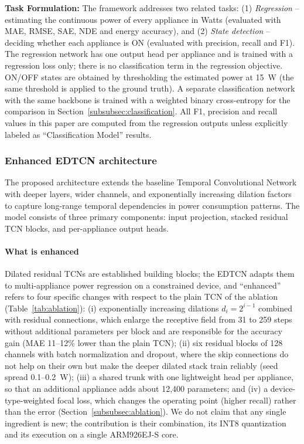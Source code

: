 \documentclass[fleqn,10pt]{wlscirep}
\begin{document}
\textbf{Task Formulation:} The framework addresses two related tasks: (1) \textit{Regression} -- estimating the continuous power of every appliance in Watts (evaluated with MAE, RMSE, SAE, NDE and energy accuracy), and (2) \textit{State detection} -- deciding whether each appliance is ON (evaluated with precision, recall and F1). The regression network has one output head per appliance and is trained with a regression loss only; there is no classification term in the regression objective. ON/OFF states are obtained by thresholding the estimated power at 15~W (the same threshold is applied to the ground truth). A separate classification network with the same backbone is trained with a weighted binary cross-entropy for the comparison in Section~\ref{subsubsec:classification}. All F1, precision and recall values in this paper are computed from the regression outputs unless explicitly labeled as ``Classification Model'' results.

\subsubsection{Enhanced EDTCN architecture}
\label{subsubsec:dtcn_architecture}

The proposed architecture extends the baseline Temporal Convolutional Network with deeper layers, wider channels, and exponentially increasing dilation factors to capture long-range temporal dependencies in power consumption patterns. The model consists of three primary components: input projection, stacked residual TCN blocks, and per-appliance output heads.

\paragraph{What is enhanced} Dilated residual TCNs are established building blocks; the EDTCN adapts them to multi-appliance power regression on a constrained device, and ``enhanced'' refers to four specific changes with respect to the plain TCN of the ablation (Table~\ref{tab:ablation}): (i) exponentially increasing dilations $d_i=2^{i-1}$ combined with residual connections, which enlarge the receptive field from 31 to 259 steps without additional parameters per block and are responsible for the accuracy gain (MAE 11--12\% lower than the plain TCN); (ii) six residual blocks of 128 channels with batch normalization and dropout, where the skip connections do not help on their own but make the deeper dilated stack train reliably (seed spread 0.1--0.2~W); (iii) a shared trunk with one lightweight head per appliance, so that an additional appliance adds about 12{,}400 parameters; and (iv) a device-type-weighted focal loss, which changes the operating point (higher recall) rather than the error (Section~\ref{subsubsec:ablation}). We do not claim that any single ingredient is new; the contribution is their combination, its INT8 quantization and its execution on a single ARM926EJ-S core.
\end{document}
